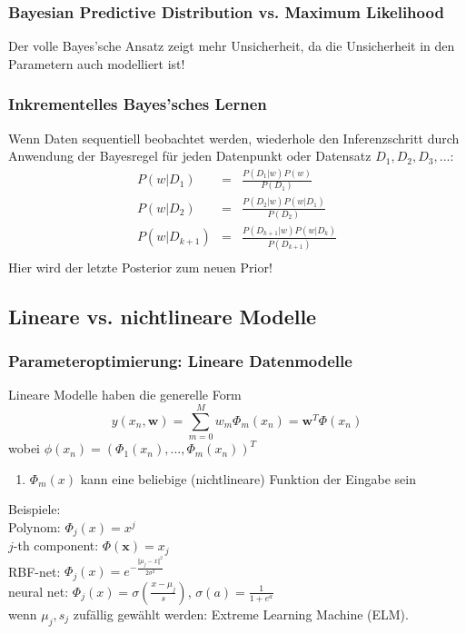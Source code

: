 	\subsubsection{Bayesian Predictive Distribution vs. Maximum Likelihood}
	Der volle Bayes'sche Ansatz zeigt mehr Unsicherheit, da die Unsicherheit in den Parametern auch modelliert ist!
	\subsubsection{Inkrementelles Bayes'sches Lernen}
	Wenn Daten sequentiell beobachtet werden, wiederhole den Inferenzschritt durch Anwendung der Bayesregel für jeden Datenpunkt oder Datensatz $D_1, D_2, D_3, ...$:
	\begin{eqnarray*}
		P(w\vert D_1) &=& \frac{P(D_1\vert w)P(w)}{P(D_1)}\\
		P(w\vert D_2) &=& \frac{P(D_2\vert w)P(w\vert D_1) }{P(D_2)}\\
		P(w\vert D_{k+1}) &=& \frac{P(D_{k+1}\vert w)P(w\vert D_k) }{P(D_{k+1})}\\
	\end{eqnarray*}
	Hier wird der letzte Posterior zum neuen Prior!
	\subsection{Lineare vs. nichtlineare Modelle}
	\subsubsection{Parameteroptimierung: Lineare Datenmodelle}
	Lineare Modelle haben die generelle Form
	\begin{equation*}
		y(x_n, \pmb{w}) = \sum_{m=0}^M w_m\Phi_m(x_n) = \pmb{w}^T\Phi(x_n)
	\end{equation*}
	wobei $\phi(x_n) = (\Phi_1(x_n), ..., \Phi_m(x_n))^T$
	\begin{enumerate}[$\hookrightarrow$]
		\item $\Phi_m(x)$ kann eine beliebige (nichtlineare) Funktion der Eingabe sein
	\end{enumerate}
	Beispiele:\\
	Polynom: $\Phi_j(x)=x^j$\\
	$j$-th component: $\Phi(\pmb{x})=x_j$\\
	RBF-net: $\Phi_j(x)=e^{-\frac{\Vert\mu_j-x\Vert^2}{2\sigma^2}}$\\
	neural net: $\Phi_j(x)=\sigma(\frac{x-\mu_j}{s})$, $\sigma(a)=\frac{1}{1+e^a}$\\
	wenn $\mu_j, s_j$ zufällig gewählt werden: Extreme Learning Machine (ELM).
